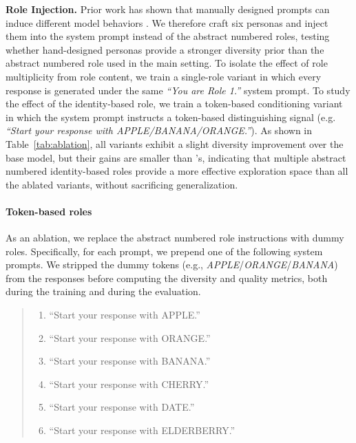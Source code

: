 \textbf{Role Injection.}
\label{ablation: role injection}
Prior work has shown that manually designed prompts can induce different model
behaviors \citep{park2024generative, argyle2023out}. We therefore craft six personas and inject them into the system prompt instead of the abstract numbered roles, testing whether hand-designed personas provide a stronger diversity prior than the abstract numbered role used in the main setting. To isolate the effect of role multiplicity from role content, we train a single-role variant in which every response is generated under the same \textit{``You are Role 1.''} system prompt. To study the effect of the identity-based role, we train a token-based conditioning variant in which the system prompt instructs a token-based distinguishing signal (e.g. \textit{``Start your response with APPLE/BANANA/ORANGE.''}).
As shown in Table~\ref{tab:ablation}, all variants exhibit a slight diversity improvement over the base model, but their gains are smaller than \method{}'s, indicating that multiple abstract numbered identity-based roles provide a more effective exploration space than all the ablated variants, without sacrificing generalization.

\paragraph{Token-based roles}
As an ablation, we replace the abstract numbered role instructions with dummy roles. Specifically, for each prompt, we prepend one of the
following system prompts. We stripped the dummy tokens (e.g., \textit{APPLE}/\textit{ORANGE}/\textit{BANANA}) from the responses before computing the diversity and quality metrics, both during the training and during the evaluation.

\begin{quote}
\small
\begin{enumerate}
    \item ``Start your response with APPLE.''
    \item ``Start your response with ORANGE.''
    \item ``Start your response with BANANA.''
    \item ``Start your response with CHERRY.''
    \item ``Start your response with DATE.''
    \item ``Start your response with ELDERBERRY.''
\end{enumerate}
\end{quote}


